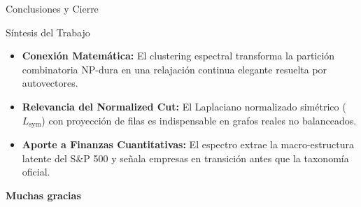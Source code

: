 \documentclass[aspectratio=169, 10pt]{beamer}
\begin{document}
	

	
\begin{frame}{Conclusiones y Cierre}
	\begin{block}{Síntesis del Trabajo}
		\begin{itemize}
			\item \textbf{Conexión Matemática:} El clustering espectral transforma la partición combinatoria NP-dura en una relajación continua elegante resuelta por autovectores.
			\item \textbf{Relevancia del Normalized Cut:} El Laplaciano normalizado simétrico (\(L_{\text{sym}}\)) con proyección de filas es indispensable en grafos reales no balanceados.
			\item \textbf{Aporte a Finanzas Cuantitativas:} El espectro extrae la macro-estructura latente del S\&P 500 y señala empresas en transición antes que la taxonomía oficial.
		\end{itemize}
	\end{block}
	\vspace{0.4cm}
	\centering
	\textbf{\Large Muchas gracias}\\


\end{frame}
	
\end{document}
